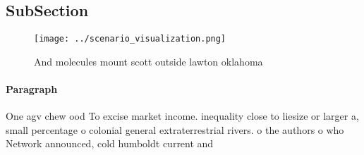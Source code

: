 \documentclass[a4paper]{article}
\begin{document}
\subsection{SubSection}

\begin{figure}
\centering
\texttt{[image: ../scenario\_visualization.png]}
\caption{And molecules mount scott outside lawton oklahoma
}
\end{figure}
 
\paragraph{Paragraph}
One agv chew ood To excise market income. inequality close to liesize or larger a, small percentage o colonial general extraterrestrial rivers. o the authors o who Network announced, cold humboldt current and 
\end{document}
